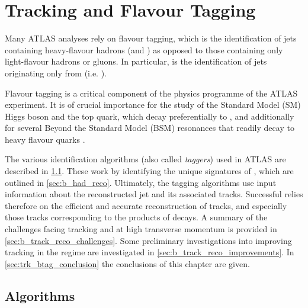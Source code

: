 \chapter{Tracking and Flavour Tagging}\label{chap:tracking}

Many ATLAS analyses rely on flavour tagging, which is the identification of jets containing heavy-flavour hadrons (\bhadrons and \chadrons) as opposed to those containing only light-flavour hadrons or gluons.
In particular, \btagging is the identification of jets originating only from \bhadrons (i.e. \bjets).

Flavour tagging is a critical component of the physics programme of the ATLAS experiment. 
It is of crucial importance for the study of the Standard Model (SM) Higgs boson and the top quark, which decay preferentially to \bquarks \cite{HIGG-2018-04,HIGG-2018-13}, and additionally for several Beyond the Standard Model (BSM) resonances that readily decay to heavy flavour quarks \cite{EXOT-2019-03}.

The various \bjet identification algorithms (also called \textit{taggers}) used in ATLAS are described in \cref{sec:btagging_algs}.
These work by identifying the unique signatures of \bjets, which are outlined in \cref{sec:b_had_reco}.
Ultimately, the tagging algorithms use input information about the reconstructed jet and its associated tracks.
Successful \btagging relies therefore on the efficient and accurate reconstruction of tracks, and especially those tracks corresponding to the products of \bhadron decays.
A summary of the challenges facing tracking and \btagging at high transverse momentum is provided in \cref{sec:b_track_reco_challenges}.
Some preliminary investigations into improving tracking in the \highpt regime are investigated in \cref{sec:b_track_reco_improvements}.
In \cref{sec:trk_btag_conclusion} the conclusions of this chapter are given.


\section{\texorpdfstring{\btagging}{b-tagging} Algorithms}\label{sec:btagging_algs}


